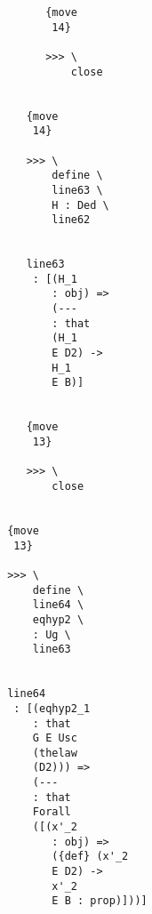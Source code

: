 \documentclass[12pt]{article}
\begin{document}
\begin{verbatim}
                                             {move 
                                              14}

                                             >>> \
                                                 close


                                          {move 
                                           14}

                                          >>> \
                                              define \
                                              line63 \
                                              H : Ded \
                                              line62


                                          line63 
                                           : [(H_1 
                                              : obj) => 
                                              (--- 
                                              : that 
                                              (H_1 
                                              E D2) -> 
                                              H_1 
                                              E B)]


                                          {move 
                                           13}

                                          >>> \
                                              close


                                       {move 
                                        13}

                                       >>> \
                                           define \
                                           line64 \
                                           eqhyp2 \
                                           : Ug \
                                           line63


                                       line64 
                                        : [(eqhyp2_1 
                                           : that 
                                           G E Usc 
                                           (thelaw 
                                           (D2))) => 
                                           (--- 
                                           : that 
                                           Forall 
                                           ([(x'_2 
                                              : obj) => 
                                              ({def} (x'_2 
                                              E D2) -> 
                                              x'_2 
                                              E B : prop)]))]



\end{verbatim}
\end{document}
